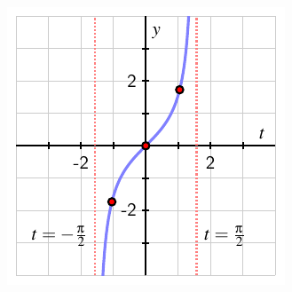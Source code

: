 \documentclass{ximera}
\begin{document}
\begin{problem}
\includegraphics[width=1\linewidth]{inverse-tan-graph.pdf}
\end{problem}
\end{document}
